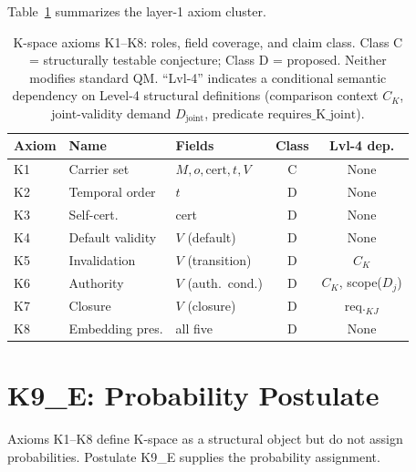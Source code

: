 \documentclass[12pt,a4paper]{article}
\theoremstyle{plain}
\theoremstyle{definition}
\theoremstyle{remark}
\newcommand{\CK}{C_K}
\begin{document}
\medskip
Table~\ref{tab:axioms} summarizes the layer-1 axiom cluster.

\begin{table}[ht]
\centering\small
\caption{K-space axioms K1--K8: roles, field coverage, and claim class.
Class C = structurally testable conjecture; Class D = proposed.
Neither modifies standard QM.
``Lvl-4'' indicates a conditional semantic dependency on Level-4
structural definitions (comparison context $\CK$,
joint-validity demand $D_{\mathrm{joint}}$, predicate
$\mathrm{requires\_K\_joint}$).}
\label{tab:axioms}
\begin{tabular}{@{}lllcc@{}}
\toprule
\textbf{Axiom} & \textbf{Name} & \textbf{Fields} &
\textbf{Class} & \textbf{Lvl-4 dep.} \\
\midrule
K1 & Carrier set      & $M,o,\mathrm{cert},t,V$ & C & None \\
K2 & Temporal order   & $t$                      & D & None \\
K3 & Self-cert.       & cert                     & D & None \\
K4 & Default validity & $V$ (default)            & D & None \\
K5 & Invalidation     & $V$ (transition)         & D & $\CK$ \\
K6 & Authority        & $V$ (auth.\ cond.)       & D & $\CK$, scope($D_j$) \\
K7 & Closure          & $V$ (closure)            & D & req.$_{KJ}$ \\
K8 & Embedding pres.  & all five                 & D & None \\
\bottomrule
\end{tabular}
\end{table}

\section{K9\_E: Probability Postulate}
\label{sec:K9E}

Axioms K1--K8 define K-space as a structural object but do not assign
probabilities. Postulate K9\_E supplies the probability assignment.
\end{document}
